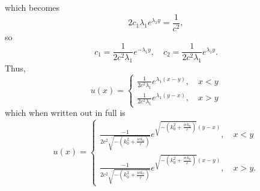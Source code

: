 \documentclass{article}
\begin{document}
which becomes
\[
2c_1\lambda_1e^{\lambda_1y}=\frac{1}{c^2},
\]
so
\[
c_1=\frac{1}{2c^2\lambda_1}e^{-\lambda_1y},\quad c_2=\frac{1}{2c^2\lambda_1}e^{\lambda_1y}.
\]
Thus, 
\[
u(x)=\begin{cases}
	\frac{1}{2c^2\lambda_1}e^{\lambda_1(x-y)}, \quad x<y\\
	\frac{1}{2c^2\lambda_1}e^{\lambda_1(y-x)}, \quad x>y
\end{cases}
\]
which when written out in full is
\[
u(x)=\begin{cases}
	\frac{-1}{2c^2\sqrt{-\left(k_0^2+\frac{i\epsilon k_0}{c}\right)}}e^{\sqrt{-\left(k_0^2+\frac{i\epsilon k_0}{c}\right)}(y-x)}, \quad x<y\\
	\frac{-1}{2c^2\sqrt{-\left(k_0^2+\frac{i\epsilon k_0}{c}\right)}}e^{\sqrt{-\left(k_0^2+\frac{i\epsilon k_0}{c}\right)}(x-y)}, \quad x>y.
\end{cases}
\]
\end{document}
